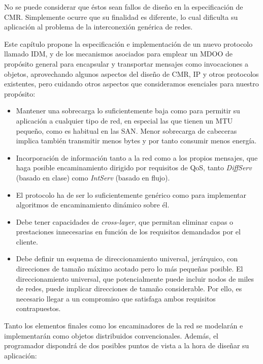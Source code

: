 \documentclass{arco-article}
\newcommand{\fg}[1]{\textit{#1}}
\begin{document}
No se puede considerar que éstos sean fallos de diseño en la
especificación de \ac{CMR}. Simplemente ocurre que su finalidad es
diferente, lo cual dificulta su aplicación al problema de la
interconexión genérica de redes.

Este capítulo propone la especificación e implementación de un nuevo
protocolo llamado \ac{IDM}, y de los mecanismos asociados
para emplear un \ac{MDOO} de propósito general para encapsular y
transportar mensajes como invocaciones a objetos, aprovechando algunos
aspectos del diseño de \ac{CMR}, \ac{IP} y otros protocolos existentes,
pero cuidando otros aspectos que consideramos esenciales para nuestro
propósito:

\begin{itemize}
\item Mantener una sobrecarga lo suficientemente baja como para
  permitir su aplicación a cualquier tipo de red, en especial las que
  tienen un \ac{MTU} pequeño, como es habitual en las \ac{SAN}. Menor
  sobrecarga de cabeceras implica también transmitir menos bytes y por
  tanto consumir menos energía.

\item Incorporación de información tanto a la red como a los propios
  mensajes, que haga posible encaminamiento dirigido por requisitos de
  \ac{QoS}, tanto \fg{DiffServ} (basado en clase) como \fg{IntServ}
  (basado en flujo).

\item El protocolo ha de ser lo suficientemente genérico como para
  implementar algoritmos de encaminamiento dinámico sobre él.

\item Debe tener capacidades de \fg{cross-layer}, que permitan
  eliminar capas o prestaciones innecesarias en función de los
  requisitos demandados por el cliente.

\item Debe definir un esquema de direccionamiento universal,
  jerárquico, con direcciones de tamaño máximo acotado pero lo más
  pequeñas posible. El direccionamiento universal, que potencialmente
  puede incluir nodos de miles de redes, puede implicar direcciones de
  tamaño considerable. Por ello, es necesario llegar a un compromiso que
  satisfaga ambos requisitos contrapuestos.
\end{itemize}

Tanto los elementos finales como los encaminadores de la red se
modelarán e implementarán como objetos distribuidos
convencionales. Además, el programador dispondrá de dos posibles
puntos de vista a la hora de diseñar su aplicación:
\end{document}
